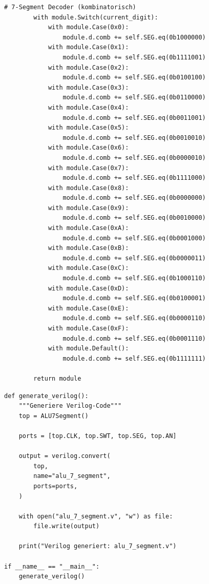 ﻿\documentclass[12pt,a4paper]{report}
\begin{document}
\begin{lstlisting}[style=pythonstyle, caption={Amaranth ALU-Implementation - Teil 6: 7-Segment Decoder}]
        # 7-Segment Decoder (kombinatorisch)
        with module.Switch(current_digit):
            with module.Case(0x0):
                module.d.comb += self.SEG.eq(0b1000000)
            with module.Case(0x1):
                module.d.comb += self.SEG.eq(0b1111001)
            with module.Case(0x2):
                module.d.comb += self.SEG.eq(0b0100100)
            with module.Case(0x3):
                module.d.comb += self.SEG.eq(0b0110000)
            with module.Case(0x4):
                module.d.comb += self.SEG.eq(0b0011001)
            with module.Case(0x5):
                module.d.comb += self.SEG.eq(0b0010010)
            with module.Case(0x6):
                module.d.comb += self.SEG.eq(0b0000010)
            with module.Case(0x7):
                module.d.comb += self.SEG.eq(0b1111000)
            with module.Case(0x8):
                module.d.comb += self.SEG.eq(0b0000000)
            with module.Case(0x9):
                module.d.comb += self.SEG.eq(0b0010000)
            with module.Case(0xA):
                module.d.comb += self.SEG.eq(0b0001000)
            with module.Case(0xB):
                module.d.comb += self.SEG.eq(0b0000011)
            with module.Case(0xC):
                module.d.comb += self.SEG.eq(0b1000110)
            with module.Case(0xD):
                module.d.comb += self.SEG.eq(0b0100001)
            with module.Case(0xE):
                module.d.comb += self.SEG.eq(0b0000110)
            with module.Case(0xF):
                module.d.comb += self.SEG.eq(0b0001110)
            with module.Default():
                module.d.comb += self.SEG.eq(0b1111111)
        
        return module
\end{lstlisting}

\begin{lstlisting}[style=pythonstyle, caption={Verilog-Generierung}]
def generate_verilog():
    """Generiere Verilog-Code"""
    top = ALU7Segment()
    
    ports = [top.CLK, top.SWT, top.SEG, top.AN]
    
    output = verilog.convert(
        top,
        name="alu_7_segment",
        ports=ports,
    )
    
    with open("alu_7_segment.v", "w") as file:
        file.write(output)
    
    print("Verilog generiert: alu_7_segment.v")

if __name__ == "__main__":
    generate_verilog()
\end{lstlisting}
\end{document}

